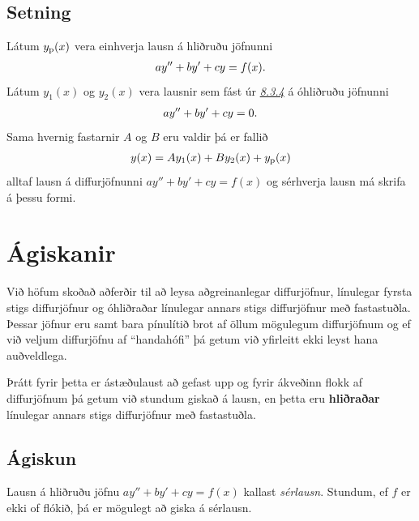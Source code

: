 \documentclass[b5paper,10pt,icelandic]{sphinxmanual}
\begin{document}
\subsection{Setning}
\label{kafli08:id4}
Látum \(y_{\rm p}(x)\) vera einhverja lausn á hliðruðu jöfnunni
\begin{gather}
\begin{split}ay''+by'+cy=f(x).\end{split}\notag
\end{gather}
Látum \(y_1(x)\) og \(y_2(x)\) vera lausnir sem fást úr {\hyperref[kafli08:stigs\string-ohlidrud]{\emph{8.3.4}}} á
óhliðruðu jöfnunni
\begin{gather}
\begin{split}ay''+by'+cy=0.\end{split}\notag
\end{gather}
Sama hvernig fastarnir \(A\) og \(B\) eru valdir þá er fallið
\begin{gather}
\begin{split}y(x)=Ay_1(x)+By_2(x)+y_{\rm p}(x)\end{split}\notag
\end{gather}
alltaf lausn á diffurjöfnunni \(ay''+by'+cy=f(x)\) og sérhverja
lausn má skrifa á þessu formi.


\section{Ágiskanir}
\label{kafli08:agiskanir}
Við höfum skoðað aðferðir til að leysa aðgreinanlegar diffurjöfnur,
línulegar fyrsta stigs diffurjöfnur og óhliðraðar línulegar
annars stigs diffurjöfnur með fastastuðla. Þessar jöfnur eru
samt bara pínulítið brot af öllum mögulegum diffurjöfnum og ef við
veljum diffurjöfnu af ``handahófi'' þá getum við yfirleitt ekki
leyst hana auðveldlega.

Þrátt fyrir þetta er ástæðulaust að gefast upp og fyrir ákveðinn flokk
af diffurjöfnum þá getum við stundum giskað á lausn, en þetta eru
\textbf{hliðraðar} línulegar annars stigs diffurjöfnur með fastastuðla.


\subsection{Ágiskun}
\label{kafli08:agiskun}\label{kafli08:id5}\label{kafli08:index-7}
Lausn á hliðruðu jöfnu \(ay''+by'+cy=f(x)\) kallast \emph{sérlausn}.
Stundum, ef \(f\) er ekki of flókið, þá er mögulegt að giska á sérlausn.
\end{document}
